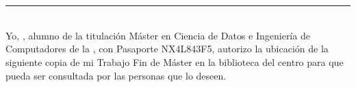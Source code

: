 \chapter*{}


% 


\thispagestyle{empty}

\begin{center}
{\large\bfseries \myTitle}\\
\end{center}
\begin{center}
\myName\\
\end{center}

\\

\\
\cleardoublepage


\thispagestyle{empty}


\begin{center}
{\large\bfseries \myTitleENG}\\
\end{center}
\begin{center}
\myName \\
\end{center}

\\

\\

\chapter*{}
\thispagestyle{empty}

\noindent\rule[-1ex]{\textwidth}{2pt}\\[4.5ex]

Yo, \textbf{\myName}, alumno de la titulación Máster en Ciencia de Datos e Ingeniería de Computadores
de la \textbf{\myFaculty}, 
con Pasaporte NX4L843F5, autorizo la ubicación de la siguiente copia de mi 
Trabajo Fin de Máster en la biblioteca del centro para que pueda ser
consultada por las personas que lo deseen.

